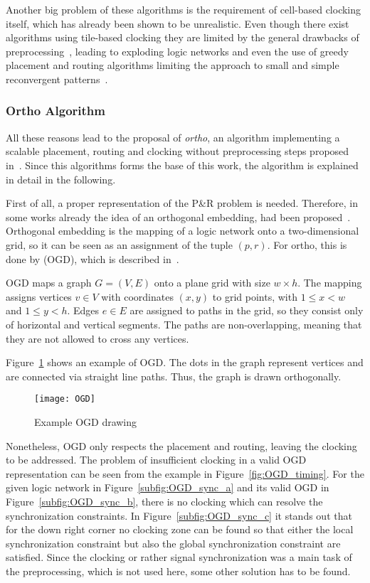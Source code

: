Another big problem of these algorithms is the requirement of cell-based clocking itself, which has already been shown to be unrealistic. Even though there exist algorithms using tile-based clocking they are limited by the general drawbacks of preprocessing~\cite{trindade2016placement}, leading to exploding logic networks and even the use of greedy placement and routing algorithms limiting the approach to small and simple reconvergent patterns~\cite{QCA-LG}.

\subsubsection{Ortho Algorithm}
All these reasons lead to the proposal of \emph{ortho}, an algorithm implementing a scalable placement, routing and clocking without preprocessing steps proposed in~\cite{ortho}. Since this algorithms forms the base of this work, the algorithm is explained in detail in the following.

First of all, a proper representation of the P\&R problem is needed. Therefore, in some works already the idea of an orthogonal embedding, had been proposed~\cite{dummy_and_buffer_nodes}. Orthogonal embedding is the mapping of a logic network onto a two-dimensional grid, so it can be seen as an assignment of the tuple $(p, r)$. For ortho, this is done by  (OGD), which is described in~\cite{OGD}.

\begin{definition}
	OGD maps a graph $G = (V, E)$ onto a plane grid with size $w \times h$. The mapping assigns vertices $v \in V$ with coordinates $(x, y)$ to grid points, with $1 \leq x < w$ and $1 \leq y < h$. Edges $e \in E$ are assigned to paths in the grid, so they consist only of horizontal and vertical segments. The paths are non-overlapping, meaning that they are not allowed to cross any vertices.
\end{definition}

Figure~\ref{fig:OGD_example} shows an example of OGD. The dots in the graph represent vertices and are connected via straight line paths. Thus, the graph is drawn orthogonally.

\begin{figure}
	\centering
	\texttt{[image: OGD]}
	\caption{Example OGD drawing~\cite{OGD}}\label{fig:OGD_example}
\end{figure}

Nonetheless, OGD only respects the placement and routing, leaving the clocking to be addressed. The problem of insufficient clocking in a valid OGD representation can be seen from the example in Figure~\ref{fig:OGD_timing}. For the given logic network in Figure~\ref{subfig:OGD_sync_a} and its valid OGD in Figure~\ref{subfig:OGD_sync_b}, there is no clocking which can resolve the synchronization constraints. In Figure~\ref{subfig:OGD_sync_c} it stands out that for the down right corner no clocking zone can be found so that either the local synchronization constraint but also the global synchronization constraint are satisfied. Since the clocking or rather signal synchronization was a main task of the preprocessing, which is not used here, some other solution has to be found.

